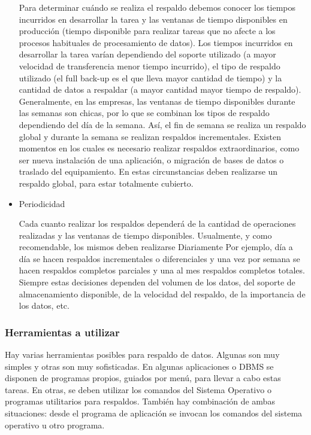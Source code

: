 \documentclass[a4paper,openright,12pt]{book}
\begin{document}
\begin{itemize}
Para determinar cuándo se realiza el respaldo debemos conocer los tiempos incurridos en desarrollar la tarea y las ventanas de tiempo disponibles en producción (tiempo disponible para realizar tareas que no afecte a los procesos habituales de procesamiento de datos). Los tiempos incurridos en desarrollar la tarea varían dependiendo del soporte utilizado (a mayor velocidad de transferencia menor tiempo incurrido), el tipo de respaldo utilizado (el full back-up es el que lleva mayor cantidad de tiempo) y la cantidad de datos a respaldar (a mayor cantidad mayor tiempo de respaldo). 
Generalmente, en las empresas, las ventanas de tiempo disponibles durante las semanas son chicas, por lo que se combinan los tipos de respaldo  dependiendo del día de la semana. Así, el fin de semana se realiza un respaldo global y durante la semana se realizan respaldos incrementales. Existen momentos en los cuales es necesario realizar respaldos extraordinarios, como ser nueva instalación de una aplicación, o migración de bases de datos o traslado del equipamiento. En estas circunstancias deben realizarse un respaldo global, para estar totalmente cubierto. 

\item Periodicidad 
 
Cada cuanto realizar los respaldos dependerá de la cantidad de operaciones realizadas y las ventanas de tiempo disponibles. Usualmente, y como recomendable, los mismos deben realizarse Diariamente Por ejemplo, día a día se hacen respaldos incrementales o diferenciales y una vez por semana se hacen respaldos completos parciales y una al mes respaldos completos totales. Siempre estas decisiones dependen del volumen de los datos, del soporte de almacenamiento disponible, de la velocidad del respaldo, de la importancia de los datos, etc. 

\end{itemize}
\subsubsection{Herramientas a utilizar }
Hay varias herramientas posibles para respaldo de datos. Algunas son muy simples y otras son muy sofisticadas. En algunas aplicaciones o DBMS se disponen de programas propios, guiados por menú, para llevar a cabo estas tareas. En otras, se deben utilizar los comandos del Sistema Operativo o programas utilitarios para respaldos. También hay combinación de ambas situaciones: desde el programa de aplicación se invocan los comandos del sistema operativo u otro programa. 
 
\end{document}
